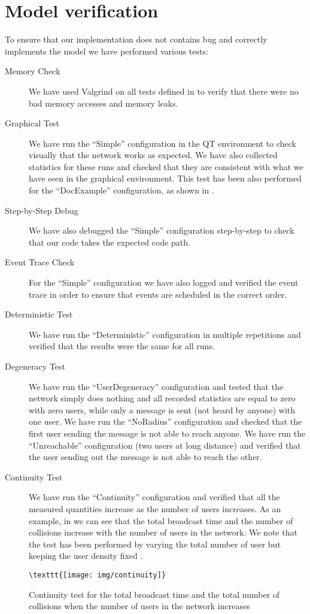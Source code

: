\section{Model verification}\label{sec:verification}

To ensure that our implementation does not contains bug and correctly implements
the model we have performed various tests:
\begin{description}
	\item[Memory Check] We have used Valgrind on all tests defined in
		 to verify that there were no bad memory
		accesses and memory leaks.
	\item[Graphical Test] We have run the ``Simple'' configuration in the
		\omnetpp{} QT environment to check visually that the network
		works as expected. We have also collected statistics for these
		runs and checked that they are consistent with what we have seen
		in the graphical environment. This test has been also performed
		for the ``DocExample'' configuration, as shown in
		.
	\item[Step-by-Step Debug] We have also debugged the ``Simple''
		configuration step-by-step to check that our code takes the
		expected code path.
	\item[Event Trace Check] For the ``Simple'' configuration we have also
		logged and verified the event trace in order to ensure that
		events are scheduled in the correct order.
	\item[Deterministic Test] We have run the ``Deterministic''
		configuration in multiple repetitions and verified that the
		results were the same for all runs.
	\item[Degeneracy Test] We have run the ``UserDegeneracy'' configuration
		and tested that the network simply does nothing and all recorded
		statistics are equal to zero with zero users, while only a
		message is sent (not heard by anyone) with one user. We have run
		the ``NoRadius'' configuration and checked that the first user
		sending the message is not able to reach anyone. We have run the
		``Unreachable'' configuration (two users at long distance) and
		verified that the user sending out the message is not able to
		reach the other.
	\item[Continuity Test] We have run the ``Continuity'' configuration and
		verified that all the measured quantities increase as the number
		of users increases. As an example, in 
		we can see that the total broadcast time and the number of
		collisions increase with the number of users in the network. We
		note that the test has been performed by varying the total
		number of user but keeping the user density fixed .
\end{description}

\begin{figure}[htb]
	\centering
	\verb|\texttt{[image: img/continuity]}|
	\caption{Continuity test for the total broadcast time and the total
	number of collisions when the number of users in the network
	increases}\label{fig:continuity}
\end{figure}
